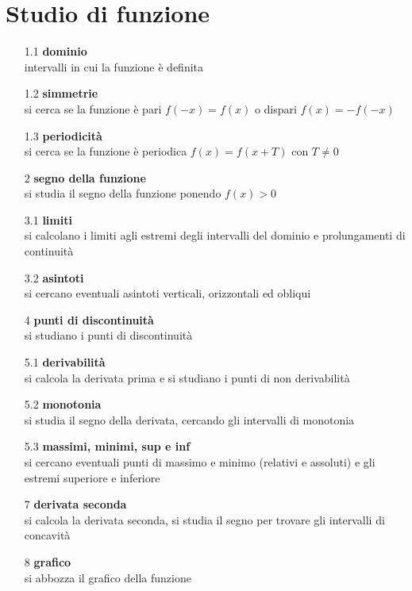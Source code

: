 \documentclass[a4paper]{article}
\begin{document}
\section{Studio di funzione}
\begin{itemize}
	\item[1.1] \textbf{dominio} \\
	intervalli in cui la funzione è definita
	\item[1.2] \textbf{simmetrie} \\
	si cerca se la funzione è pari \(f(-x) = f(x)\) o dispari \(f(x) = -f(-x)\)
	\item[1.3] \textbf{periodicità} \\
	si cerca se la funzione è periodica \(f(x) = f(x + T)\) con \(T \neq 0\)
	\item[2] \textbf{segno della funzione} \\
	si studia il segno della funzione ponendo \(f(x) > 0\)
	\item[3.1] \textbf{limiti} \\
	si calcolano i limiti agli estremi degli intervalli del dominio e prolungamenti di continuità
	\item[3.2] \textbf{asintoti} \\
	si cercano eventuali asintoti verticali, orizzontali ed obliqui
	\item[4] \textbf{punti di discontinuità} \\
	si studiano i punti di discontinuità
	\item[5.1] \textbf{derivabilità} \\
	si calcola la derivata prima e si studiano i punti di non derivabilità
	\item[5.2] \textbf{monotonia} \\
	si studia il segno della derivata, cercando gli intervalli di monotonia
	\item[5.3] \textbf{massimi, minimi, sup e inf} \\
	si cercano eventuali punti di massimo e minimo (relativi e assoluti) e gli estremi superiore e inferiore
	\item[7] \textbf{derivata seconda} \\
	si calcola la derivata seconda, si studia il segno per trovare gli intervalli di concavità
	\item[8] \textbf{grafico} \\
	si abbozza il grafico della funzione
\end{itemize}

\newpage
\end{document}
